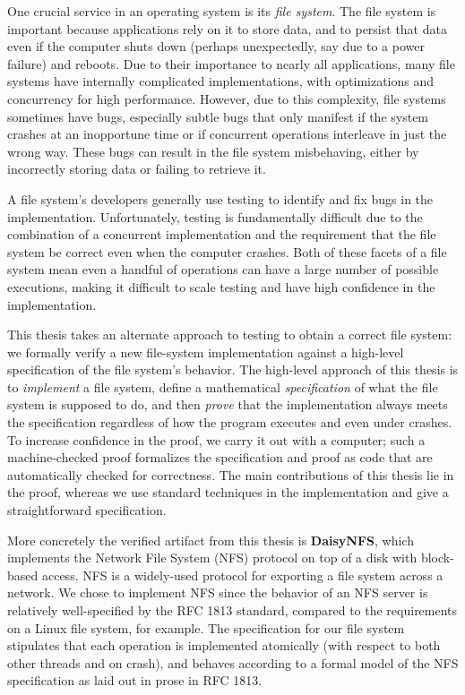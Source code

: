 One crucial service in an operating system is its \emph{file system}. The file
system is important because applications rely on it to store data, and to
persist that data even if the computer shuts down (perhaps unexpectedly, say due
to a power failure) and reboots. Due to their importance to nearly all applications, many
file systems have internally complicated implementations, with optimizations and
concurrency for high performance. However, due to this complexity, file systems
sometimes have bugs, especially subtle bugs that only manifest if the system
crashes at an inopportune time or if concurrent operations interleave in just
the wrong way. These bugs can result in the file system misbehaving, either by
incorrectly storing data or failing to retrieve it.

A file system's developers generally use testing to identify and fix bugs in the
implementation. Unfortunately, testing is fundamentally difficult due to the
combination of a concurrent implementation and the requirement that the file
system be correct even when the computer crashes. Both of these facets of a file
system mean even a handful of operations can have a large number of possible
executions, making it difficult to scale testing and have high confidence in the
implementation.

This thesis takes an alternate approach to testing to obtain a correct file
system: we formally verify a new file-system implementation against a high-level
specification of the file system's behavior. The high-level approach of this
thesis is to \emph{implement} a file system, define a mathematical
\emph{specification} of what the file system is supposed to do, and then
\emph{prove} that the implementation always meets the specification regardless
of how the program executes and even under crashes. To increase confidence in
the proof, we carry it out with a computer; such a machine-checked proof
formalizes the specification and proof as code that are automatically checked
for correctness. The main contributions of this thesis lie in the proof, whereas
we use standard techniques in the implementation and give a straightforward
specification.

More concretely the verified
artifact from this thesis is \textbf{DaisyNFS}, which implements the Network
File System (NFS) protocol on top of a disk with block-based access. NFS is a
widely-used protocol for exporting a file system across a network. We chose to
implement NFS since the behavior of an NFS server is relatively well-specified
by the RFC 1813 standard, compared to the requirements on a Linux file system,
for example. The specification for our file system stipulates that each
operation is implemented atomically (with respect to both other threads and on
crash), and behaves according to a formal model of the NFS specification as laid
out in prose in RFC 1813.

